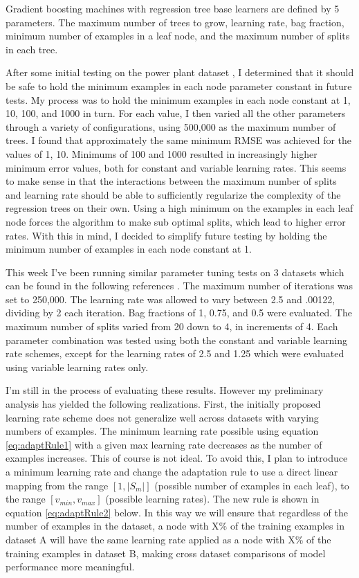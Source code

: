 \documentclass[runningheads]{llncs_2}
\begin{document}
Gradient boosting machines with regression tree base learners are defined by 5 parameters. The maximum number of trees to grow, learning rate, bag fraction, minimum number of examples in a leaf node, and the maximum number of splits in each tree.

After some initial testing on the power plant dataset \cite{powerPlantDataset}, I determined that it should be safe to hold the minimum examples in each node parameter constant in future tests. My process was to hold the minimum examples in each node constant at 1, 10, 100, and 1000 in turn. For each value, I then varied all the other parameters through a variety of configurations, using 500,000 as the maximum number of trees. I found that approximately the same minimum RMSE was achieved for the values of 1, 10. Minimums of 100 and 1000 resulted in increasingly higher minimum error values, both for constant and variable learning rates. This seems to make sense in that the interactions between the maximum number of splits and learning rate should be able to sufficiently regularize the complexity of the regression trees on their own. Using a high minimum on the examples in each leaf node forces the algorithm to make sub optimal splits, which lead to higher error rates. With this in mind, I decided to simplify future testing by holding the minimum number of examples in each node constant at 1.

This week I've been running similar parameter tuning tests on 3  datasets which can be found in the following references \cite{airFoilDataset} \cite{bikeSharingDataset} \cite{powerPlantDataset}. The maximum number of iterations was set to 250,000. The learning rate was allowed to vary between 2.5 and .00122, dividing by 2 each iteration. Bag fractions of 1, 0.75, and 0.5 were evaluated. The maximum number of splits varied from 20 down to 4, in increments of 4. Each parameter combination was tested using both the constant and variable learning rate schemes, except for the learning rates of 2.5 and 1.25 which were evaluated using variable learning rates only. 

I'm still in the process of evaluating these results. However my preliminary analysis has yielded the following realizations. First, the initially proposed learning rate scheme does not generalize well across datasets with varying numbers of examples. The minimum learning rate possible using equation \ref{eq:adaptRule1} with a given max learning rate decreases as the number of examples increases. This of course is not ideal. To avoid this, I plan to introduce a minimum learning rate and change the adaptation rule to use a direct linear mapping from the range $[1, |S_m|]$ (possible number of examples in each leaf), to the range $[v_{min}, v_{max}]$ (possible learning rates). The new rule is shown in equation \ref{eq:adaptRule2} below. In this way we will ensure that regardless of the number of examples in the dataset, a node with X\% of the training examples in dataset A will have the same learning rate applied as a node with X\% of the training examples in dataset B, making cross dataset comparisons of model performance more meaningful.
\end{document}
